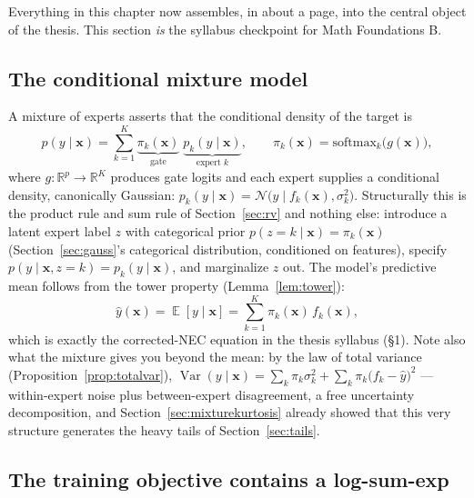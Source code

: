\documentclass[11pt]{article}
\numberwithin{equation}{section}
\theoremstyle{plain}
\theoremstyle{definition}
\theoremstyle{remark}
\DeclareMathOperator{\E}{\mathbb{E}}
\DeclareMathOperator{\Var}{Var}
\newcommand{\Normal}{\mathcal{N}}
\newcommand{\R}{\mathbb{R}}
\newcommand{\x}{\bm{x}}
\begin{document}
Everything in this chapter now assembles, in about a page, into the central object of the thesis. This section \emph{is} the syllabus checkpoint for Math Foundations B.

\subsection{The conditional mixture model}

A mixture of experts asserts that the conditional density of the target is
\begin{equation}
p(y \mid \x)
= \sum_{k=1}^{K} \underbrace{\pi_k(\x)}_{\text{gate}} \; \underbrace{p_k(y \mid \x)}_{\text{expert }k},
\qquad
\pi_k(\x) = \mathrm{softmax}_k\big(g(\x)\big),
\label{eq:moedensity}
\end{equation}
where $g: \R^p \to \R^K$ produces gate logits and each expert supplies a conditional density, canonically Gaussian: $p_k(y \mid \x) = \Normal\big(y \mid f_k(\x), \sigma_k^2\big)$. Structurally this is the product rule and sum rule of Section~\ref{sec:rv} and nothing else: introduce a latent expert label $z$ with categorical prior $p(z = k \mid \x) = \pi_k(\x)$ (Section~\ref{sec:gauss}'s categorical distribution, conditioned on features), specify $p(y \mid \x, z = k) = p_k(y \mid \x)$, and marginalize $z$ out. The model's predictive mean follows from the tower property (Lemma~\ref{lem:tower}):
\begin{equation}
\hat y(\x) = \E[y \mid \x] = \sum_{k=1}^K \pi_k(\x)\, f_k(\x),
\label{eq:moemean}
\end{equation}
which is exactly the corrected-NEC equation in the thesis syllabus (\S1). Note also what the mixture gives you beyond the mean: by the law of total variance (Proposition~\ref{prop:totalvar}), $\Var(y \mid \x) = \sum_k \pi_k \sigma_k^2 + \sum_k \pi_k \big(f_k - \hat y\big)^2$ --- within-expert noise plus between-expert disagreement, a free uncertainty decomposition, and Section~\ref{sec:mixturekurtosis} already showed that this very structure generates the heavy tails of Section~\ref{sec:tails}.

\subsection{The training objective contains a log-sum-exp}
\end{document}
